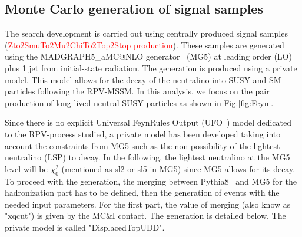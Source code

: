 \documentclass{cernatlasnote}
\begin{document}
\newpage
\begin{appendices}

\section{Monte Carlo generation of signal samples}
\label{APP: GEN}
The search development is carried out using centrally produced signal samples (\textcolor{red}{\mbox Zto2SmuTo2Mu2ChiTo2Top2Stop production}). These samples are generated using the MADGRAPH5\_aMC@NLO generator~\cite{MAD} (MG5) at leading order (LO) plus 1 jet from initial-state radiation. The generation is produced using a private model. This model allows for the decay of the neutralino into SUSY and SM particles following the RPV-MSSM. In this analysis, we focus on the pair production of long-lived neutral SUSY particles as shown in Fig.\ref{fig:Feyn}.

Since there is no explicit Universal FeynRules Output (UFO~\cite{UFO}) model dedicated to the RPV-process studied, a private model has been developed taking into account the constraints from MG5 such as the non-possibility of the lightest neutralino (LSP) to decay. In the following, the lightest neutralino at the MG5 level will be $\chi^2_{0}$ (mentioned as sl2 or sl5 in MG5) since MG5 allows for its decay. To proceed with the generation, the merging between Pythia8~\cite{bierlich2022comprehensive} and MG5 for the hadronization part has to be defined, then the generation of events with the needed input parameters.
For the first part, the value of merging (also know as "xqcut") is given by the MC\&I contact. The generation is detailed below. The private model is called "DisplacedTopUDD".


\end{appendices}
\end{document}
